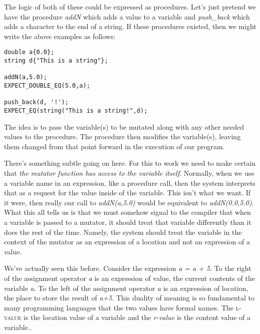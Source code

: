 \documentclass[nobib]{tufte-handout}
\begin{document}
The logic of both of these could be expressed as procedures.  Let's just pretend we have the procedure \textit{addN} which adds a value to a variable and \textit{push\_back} which adds a character to the end of a string. If these procedures existed, then we might write the above examples as follows:
\begin{verbatim}
double a{0.0};
string d{"This is a string"};

addN(a,5.0);
EXPECT_DOUBLE_EQ(5.0,a);

push_back(d, '!');
EXPECT_EQ(string("This is a string!",d);
\end{verbatim}
The idea is to pass the variable(s) to be mutated along with any other needed values to the procedure. The procedure then modifies the variable(s), leaving them changed from that point forward in the execution of our program. 

There's something subtle going on here. For this to work we need to make certain that \textit{the mutator function has access to the variable itself}.  Normally, when we use a variable name in an expression, like a procedure call, then the system interprets that as a request for the value inside of the variable. This isn't what we want. If it were, then really our call to \textit{addN(a,5.0)} would be equivalent to \textit{addN(0.0,5.0)}. What this all tells us is that we must somehow signal to the compiler that when a variable is passed to a mutator, it should treat that variable differently than it does the rest of the time. Namely, the system should treat the variable in the context of the mutator as an expression of a location and not an expression of a value.

We've actually seen this before.  Consider the expression \textit{a = a + 5}.  To the right of the assignment operator \textit{a} is an expression of value, the current contents of the variable \textit{a}.  To the left of the assignment operator \textit{a} is an expression of location, the place to store the result of \textit{a+5}.  This duality of meaning is so fundamental to many programming languages that the two values have formal names. The \textsc{l-value} is the location value of a variable and the \textit{r-value} is the content value of a variable.. 
\end{document}
